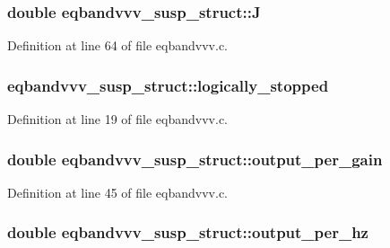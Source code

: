 \subsubsection[{\texorpdfstring{J}{J}}]{\setlength{\rightskip}{0pt plus 5cm}double eqbandvvv\+\_\+susp\+\_\+struct\+::J}\hypertarget{structeqbandvvv__susp__struct_af06a2798f39c7be17a952460ef4a6d46}{}\label{structeqbandvvv__susp__struct_af06a2798f39c7be17a952460ef4a6d46}


Definition at line 64 of file eqbandvvv.\+c.

\subsubsection[{\texorpdfstring{logically\+\_\+stopped}{logically_stopped}}]{ eqbandvvv\+\_\+susp\+\_\+struct\+::logically\+\_\+stopped}\hypertarget{structeqbandvvv__susp__struct_a3f47523fde9dcffe7ac2b42aca7dda82}{}\label{structeqbandvvv__susp__struct_a3f47523fde9dcffe7ac2b42aca7dda82}


Definition at line 19 of file eqbandvvv.\+c.

\subsubsection[{\texorpdfstring{output\+\_\+per\+\_\+gain}{output_per_gain}}]{\setlength{\rightskip}{0pt plus 5cm}double eqbandvvv\+\_\+susp\+\_\+struct\+::output\+\_\+per\+\_\+gain}\hypertarget{structeqbandvvv__susp__struct_a98aa699c8eab2ff455adedeb79602d98}{}\label{structeqbandvvv__susp__struct_a98aa699c8eab2ff455adedeb79602d98}


Definition at line 45 of file eqbandvvv.\+c.

\subsubsection[{\texorpdfstring{output\+\_\+per\+\_\+hz}{output_per_hz}}]{\setlength{\rightskip}{0pt plus 5cm}double eqbandvvv\+\_\+susp\+\_\+struct\+::output\+\_\+per\+\_\+hz}\hypertarget{structeqbandvvv__susp__struct_a69fe33993bd90aa1a1b9e4f02f7eff02}{}\label{structeqbandvvv__susp__struct_a69fe33993bd90aa1a1b9e4f02f7eff02}


